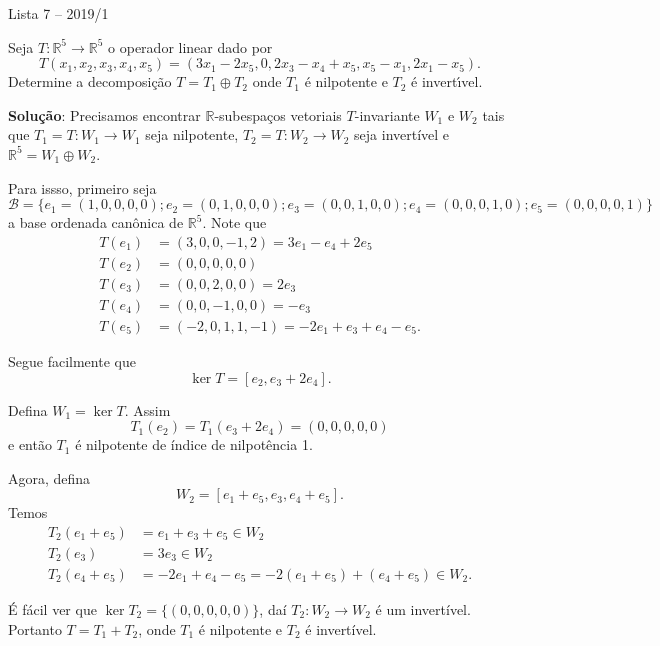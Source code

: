 \documentclass[12pt]{article}
\newcounter{exercicios}
\newcommand{\questao}{
\addtocounter{exercicios}{27}
\noindent{\bf Exerc{\'\i}cio \arabic{exercicios}: }}
\newcommand{\real}{\mathbb{R}}
\begin{document}
\begin{center}
    Lista 7 -- 2019/1
\end{center}
\questao Seja $T : \real^5 \to \real^5$ o operador linear dado por
  \[
      T(x_1,x_2,x_3,x_4,x_5) = (3x_1 -2x_5, 0 , 2x_3 - x_4 + x_5, x_5 - x_1, 2x_1 - x_5).
  \]
  Determine a decomposi\c{c}\~ao $T = T_1 \oplus T_2$ onde $T_1$ \'e nilpotente e $T_2$ \'e invert{\'\i}vel.

\textbf{Solu{\c c}{\~a}o}: Precisamos encontrar $\real$-subespaços vetoriais $T$-invariante $W_1$ e $W_2$ tais que $T_1 = T : W_1 \to W_1$ seja nilpotente, $T_2 = T : W_2 \to W_2$ seja invertível e $\real^5 = W_1 \oplus W_2$.

Para issso, primeiro seja
\[
    \mathcal{B} = \{e_1 = (1,0,0,0,0); e_2 = (0,1,0,0,0); e_3 = (0,0,1,0,0); e_4 = (0,0,0,1,0); e_5 = (0,0,0,0,1)\}
\]
a base ordenada canônica de $\real^5$. Note que
\begin{align*}
	T(e_1) &= (3,0,0,-1,2) = 3e_1 - e_4 + 2e_5\\
	T(e_2) &= (0,0,0,0,0)\\
	T(e_3) &= (0,0,2,0,0) = 2e_3\\
	T(e_4) &= (0,0,-1,0,0) = -e_3\\
	T(e_5) &= (-2,0,1,1,-1) = -2e_1 + e_3 + e_4 - e_5.
\end{align*}

Segue facilmente que
\[
 	\ker T = [e_2, e_3 + 2e_4].
\]

Defina $W_1 = \ker T$. Assim
\[
	T_1(e_2) = T_1(e_3 + 2e_4) = (0,0,0,0,0)
\]
e então $T_1$ é nilpotente de índice de nilpotência 1.

Agora, defina
\[
	W_2 = [e_1 + e_5, e_3, e_4 + e_5].
\]
Temos
\begin{align*}
	T_2(e_1 + e_5) &= e_1 + e_3 + e_5 \in W_2\\
	T_2(e_3) &= 3e_3 \in W_2\\
	T_2(e_4 + e_5) &= -2e_1 + e_4 - e_5 = -2(e_1 + e_5) + (e_4 + e_5) \in W_2.
\end{align*}

É fácil ver que $\ker T_2 = \{(0,0,0,0,0)\}$, daí $T_2 : W_2 \to W_2$ é um invertível. Portanto $T = T_1 + T_2$, onde $T_1$ é nilpotente e $T_2$ é invertível.
\end{document}
